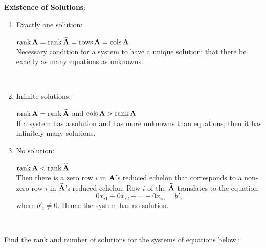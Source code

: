 \documentclass[]{book}
\theoremstyle{definition}
\theoremstyle{definition}
\theoremstyle{definition}
\theoremstyle{remark}
\begin{document}
\textbf{Existence of Solutions}:

\begin{enumerate}
        \item \parbox[t]{1.75in}{Exactly one solution:}
            \parbox[t]{4in}{$\mbox{rank\,}{\bf A} = \mbox{rank\,} \widehat{\bf A}=\mbox{rows\,} {\bf A}  = \mbox{cols\,}{\bf A}$ \\
            [3pt] Necessary condition for a system to have a unique solution: that there be exactly as many equations as unknowns.}\\
    
        \item \parbox[t]{1.75in}{Infinite solutions:} \parbox[t]{4in}{$\mbox{rank\,} {\bf A}=\mbox{rank\,} \widehat{\bf A}$ and $\mbox{cols\,} {\bf A} > \mbox{rank\,} {\bf A}$\\
            [3pt] If a system has a solution and has more unknowns than equations, then it has infinitely many solutions.}

        \item \parbox[t]{1.75in}{No solution:} \parbox[t]{4in}{$\mbox{rank\,} {\bf A} < \mbox{rank\,} \widehat{\bf A}$ \\
        [3pt] Then there is a zero row $i$ in $\bf A$'s reduced echelon that corresponds to a non-zero row $i$ in $\widehat{\bf A}$'s reduced echelon.  Row $i$ of the $\widehat{\bf A}$ translates to the equation  $$0 x_{i1} + 0 x_{i2} + \cdots + 0 x_{in} = b'_{i}$$ where $b'_{i}\ne 0$.  Hence the system has no solution.}\\

\end{enumerate}

Find the rank and number of solutions for the systems of equations
below.:
\end{document}
